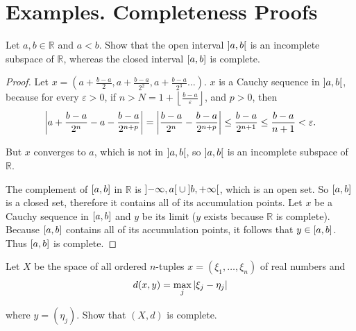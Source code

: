 \section{Examples. Completeness Proofs}

\begin{exercise}\label{chapter1:section5:exercise1}
    Let $a, b\in \mathbb{R}$ and $a < b$. Show that the open interval $\left]{a, b}\right[$ is an incomplete subspace of $\mathbb{R}$, whereas the closed interval $\left[{a, b}\right]$ is complete.
\end{exercise}

\begin{proof}
    Let $x = (a + \frac{b-a}{2}, a + \frac{b-a}{2^{2}}, a + \frac{b-a}{2^{3}} \ldots)$. $x$ is a Cauchy sequence in $\left]{a, b}\right[$, because for every $\varepsilon > 0$, if $n > N = 1 + \left\lfloor\frac{b - a}{\varepsilon}\right\rfloor$, and $p > 0$, then
    \[
        \left\vert{a + \frac{b-a}{2^{n}} - a - \frac{b-a}{2^{n+p}}}\right\vert = \left\vert{\frac{b - a}{2^{n}} - \frac{b-a}{2^{n+p}}}\right\vert \leq \frac{b-a}{2^{n+1}} \leq \frac{b-a}{n+1} < \varepsilon.
    \]

    But $x$ converges to $a$, which is not in $\left]{a, b}\right[$, so $\left]{a, b}\right[$ is an incomplete subspace of $\mathbb{R}$.

    The complement of $\left[{a, b}\right]$ in $\mathbb{R}$ is $\left]{-\infty, a}\right[\cup \left]{b, +\infty}\right[$, which is an open set. So $\left[{a, b}\right]$ is a closed set, therefore it contains all of its accumulation points. Let $x$ be a Cauchy sequence in $\left[{a, b}\right]$ and $y$ be its limit ($y$ exists because $\mathbb{R}$ is complete). Because $\left[{a, b}\right]$ contains all of its accumulation points, it follows that $y\in \left[{a, b}\right]$. Thus $\left[{a, b}\right]$ is complete.
\end{proof}

\begin{exercise}\label{chapter1:section5:exercise2}
    Let $X$ be the space of all ordered $n$-tuples $x = (\xi_{1}, \ldots, \xi_{n})$ of real numbers and
    \[
        d(x, y) = \max\limits_{j}\left\vert{\xi_{j} - \eta_{j}}\right\vert
    \]

    where $y = {(\eta_{j})}$. Show that $(X, d)$ is complete.
\end{exercise}

